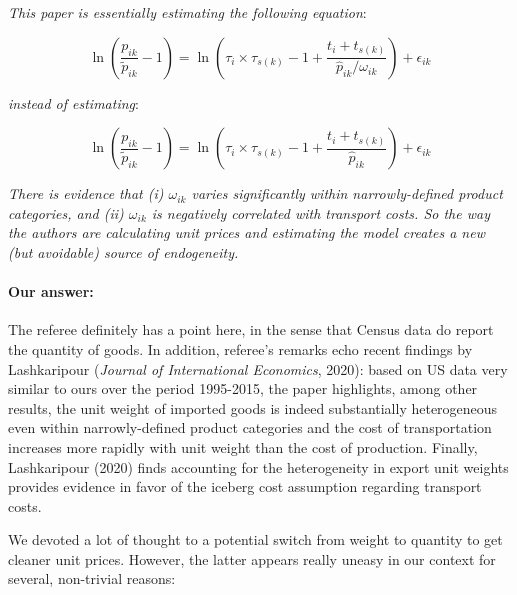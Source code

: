 \documentclass[a4paper,11pt]{article}
\begin{document}
\textit{This paper is essentially estimating the following equation}:

\begin{equation*}
\ln\left(\frac{p_{ik}}{\widetilde{p}_{ik}}-1 \right)= \ln \left(\tau_{i} \times \tau_{s(k)} -1 +\frac{t_{i} + t_{s(k)}}{\widehat{p}_{ik}/\omega_{ik}} \right) + \epsilon_{ik}
\end{equation*}

\textit{instead of estimating}:


\begin{equation*}
\ln\left(\frac{p_{ik}}{\widetilde{p}_{ik}}-1 \right)= \ln \left(\tau_{i} \times \tau_{s(k)}-1 +\frac{t_{i} + t_{s(k)}}{\widehat{p}_{ik}} \right) + \epsilon_{ik}
\end{equation*}

\textit{There is evidence that (i) $\omega_{ik}$ varies significantly within narrowly-defined product
categories, and (ii) $\omega_{ik}$ is negatively correlated with transport costs. So the
way the authors are calculating unit prices and estimating the model creates a
new (but avoidable) source of endogeneity.}

\paragraph{Our answer:}
\noindent The referee definitely has a point here, in the sense that Census data do report the quantity of goods. In addition, referee's remarks echo recent findings by Lashkaripour (\emph{Journal of International Economics}, 2020): based on US data very similar to ours over the period 1995-2015, the paper highlights, among other results, the unit weight of imported goods is indeed substantially heterogeneous even within narrowly-defined product categories and the cost of transportation increases more rapidly with unit weight than the cost of production. Finally, Lashkaripour (2020) finds accounting for the heterogeneity in export unit weights provides evidence in favor of the iceberg cost assumption regarding transport costs.

We devoted a lot of thought to a potential switch from weight to quantity to get cleaner unit prices. However, the latter appears really uneasy in our context for several, non-trivial reasons:
\end{document}
